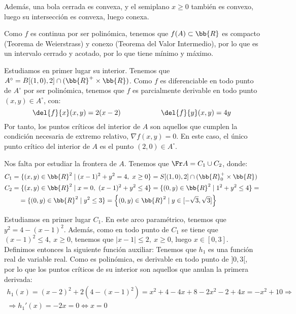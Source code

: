 \begin{ejercicio}
    Además, una bola cerrada es convexa, y el semiplano $x\geq 0$ también es convexo, luego su intersección es convexa, luego conexa. 
    
    Como $f$ es continua por ser polinómica, tenemos que $f(A)\subset \bb{R}$ es compacto (Teorema de Weierstrass) y conexo (Teorema del Valor Intermedio), por lo que es un intervalo cerrado y acotado, por lo que tiene mínimo y máximo.

    Estudiamos en primer lugar su interior. Tenemos que $A^\circ = B[(1,0),2]\cap (\bb{R}^+\times \bb{R})$. Como $f$ es diferenciable en todo punto de $A^\circ$ por ser polinómica, tenemos que $f$ es parcialmente derivable en todo punto $(x,y)\in A^\circ$, con:
    \begin{equation*}
        \del{f}{x}(x,y) = 2(x-2) \hspace{2cm}
        \del{f}{y}(x,y) = 4y
    \end{equation*}
    Por tanto, los puntos críticos del interior de $A$ son aquellos que cumplen la condición necesaria de extremo relativo, $\nabla f(x,y)=0$. En este caso, el único punto crítico del interior de $A$ es el punto $(2,0)\in A^\circ$.

    Nos falta por estudiar la frontera de $A$. Tenemos que $\Fr A = C_1 \cup C_2$, donde:
    \begin{equation*}
        \begin{split}
            C_1 &= \{(x,y)\in \bb{R}^2\mid (x-1)^2+y^2= 4,~x\geq 0\}
            =S[(1,0),2]\cap (\bb{R}^+_0\times \bb{R}) \\
            C_2 &= \{(x,y)\in \bb{R}^2\mid x= 0,~(x-1)^2+y^2\leq 4\} = 
            \{(0,y)\in \bb{R}^2\mid 1^2+y^2\leq 4\} = \\
            &\quad =\{(0,y)\in \bb{R}^2\mid y^2\leq 3\} = 
            \left\{(0,y)\in \bb{R}^2\mid y \in [-\sqrt{3}, \sqrt{3}]\right\}
        \end{split}
    \end{equation*}

    Estudiamos en primer lugar $C_1$. En este arco paramétrico, tenemos que $y^2 = 4-(x-1)^2$.
    Además, como en todo punto de $C_1$ se tiene que $(x-1)^2\leq 4,~x\geq 0$, tenemos que $|x-1|\leq 2,~x\geq 0$, luego $x\in [0,3]$.
    Definimos entonces la siguiente función auxiliar:
    Tenemos que $h_1$ es una función real de variable real. Como es polinómica, es derivable en todo punto de
    $]0,3[$, por lo que los puntos críticos de su interior son aquellos que anulan la primera derivada:
    \begin{multline*}
        h_1(x) = (x-2)^2 + 2(4-(x-1)^2) = x^2+4-4x + 8 - 2x^2 - 2 +4x = -x^2+10
        \Longrightarrow \\ \Longrightarrow
        h_1'(x) = -2x = 0 \Longleftrightarrow x=0
    \end{multline*}


\end{ejercicio}
